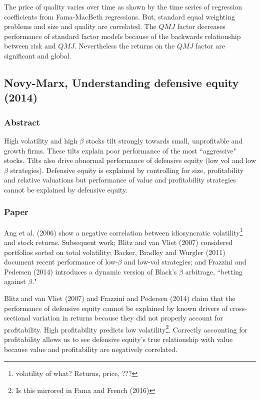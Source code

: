 The price of quality varies over time as shown by the time series of regression
coefficients from Fama-MacBeth regressions. But, standard equal weighting problems and
size and quality are correlated. The $QMJ$ factor decreases performance of standard factor
models because of the backwards relationship between risk and $QMJ$. Nevertheless the
returns on the $QMJ$ factor are significant and global.



\subsection[Novy-Marx, 2014]{Novy-Marx, Understanding defensive equity
(2014)\cite{novy2014understanding}}

\subsubsection{Abstract}

High volatility and high $\beta$ stocks tilt strongly towards small, unprofitable and
growth firms. These tilts explain poor performance of the most ``aggressive" stocks. Tilts
also drive abnormal performance of defensive equity (low vol and low $\beta$ strategies).
Defensive equity is explained by controlling for size, profitability and relative
valuations but performance of value and profitability strategies cannot be explained by
defensive equity.

\subsubsection{Paper}

Ang et al. (2006)\cite{ang2006cross} show a negative correlation between idiosyncratic
volatility\footnote{volatility of what? Returns, price, ???} and stock returns. Subsequent
work; Blitz and van Vliet (2007)\cite{blitz2007volatility} considered portfolios sorted on
total volatility; Backer, Bradley and Wurgler (2011)\cite{baker2011benchmarks} document
recent performance of low-$\beta$ and low-vol strategies; and Frazzini and Pedersen
(2014)\cite{frazzini2014betting} introduces a dynamic version of Black's $\beta$
arbitrage, ``betting against $\beta$."

Blitz and van Vliet (2007) and Frazzini and Pedersen (2014) claim that the performance of
defensive equity cannot be explained by known drivers of cross-sectional variation in
returns because they did not properly account for profitability. High profitability
predicts low volatility\footnote{Is this mirrored in Fama and French (2016)}. Correctly
accounting for profitability allows us to see defensive equity's true relationship with
value because value and profitability are negatively correlated.

